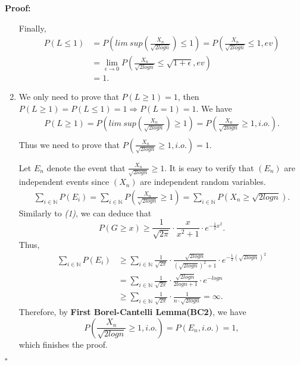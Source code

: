 \documentclass[UTF8, 12pt]{article}
\newenvironment{proof}{\noindent\ignorespaces\textbf{Proof:}}{\hfill $\square$\par\noindent}
\theoremstyle{break}
\begin{document}
\begin{proof}
\begin{enumerate}
            Finally,
            \begin{align*}
                P(L \leq 1) &= P( lim\ sup(\frac{X_n}{\sqrt{2logn}}) \leq 1) = P(\frac{X_n}{\sqrt{2logn}} \leq 1, ev) \\
                &= \lim_{\epsilon\to 0} P(\frac{X_n}{\sqrt{2logn}} \leq \sqrt{1 + \epsilon}, ev) \\
                &= 1.
            \end{align*}
            
            \item We only need to prove that $ P(L \geq 1) = 1$, then $ P(L \geq 1) = P(L \leq 1) = 1 \Longrightarrow P(L = 1) = 1 $.
            We have
            \begin{align*}
                P(L \geq 1) = P(lim\ sup(\frac{X_n}{\sqrt{2logn}}) \geq 1) = P(\frac{X_n}{\sqrt{2logn}} \geq 1, i.o.). \\ 
            \end{align*}
            Thus we need to prove that $P(\frac{X_n}{\sqrt{2logn}} \geq 1, i.o.) = 1$.

            Let $E_n$ denote the event that $\frac{X_n}{\sqrt{2logn}} \geq 1$. It is easy to verify that $(E_n)$ are independent events since $(X_n)$ are independent random variables.
            \begin{align*}
                \sum_{i \in \mathbb{N}} P(E_i) = \sum_{i \in \mathbb{N}} P(\frac{X_n}{\sqrt{2logn}} \geq 1) = \sum_{i \in \mathbb{N}} P(X_n \geq \sqrt{2logn}).
            \end{align*}
            Similarly to \textit{(1)}, we can deduce that $$ P(G \geq x) \geq \frac{1}{\sqrt{2\pi}}\cdot \frac{x}{x^2+1} \cdot e^{-\frac{1}{2}x^2}. $$
            Thus,
            \begin{align*}
                \sum_{i \in \mathbb{N}} P(E_i) &\geq \sum_{i \in \mathbb{N}} \frac{1}{\sqrt{2\pi}}\cdot \frac{\sqrt{2logn}}{(\sqrt{2logn})^2+1} \cdot e^{-\frac{1}{2}(\sqrt{2logn})^2} \\
                &= \sum_{i \in \mathbb{N}} \frac{1}{\sqrt{2\pi}}\cdot \frac{\sqrt{2logn}}{2logn+1} \cdot e^{-logn} \\
                &\geq \sum_{i \in \mathbb{N}} \frac{1}{\sqrt{2\pi}} \cdot \frac{1}{n \cdot \sqrt{2logn}} = \infty.
            \end{align*}
            Therefore, by \textbf{First Borel-Cantelli Lemma(BC2)}, we have $$ P(\frac{X_n}{\sqrt{2logn}} \geq 1, i.o.) = P(E_n, i.o.) = 1, $$ which finishes the proof.
        \end{enumerate}
    \end{proof}
\end{document}
